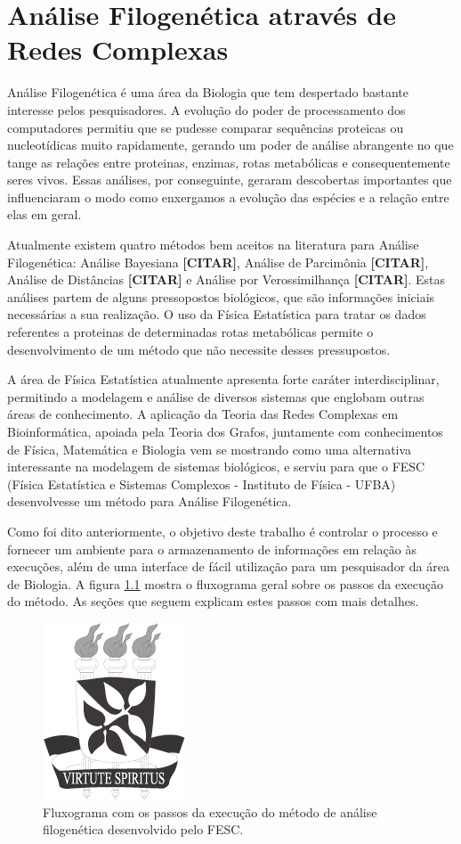 \chapter{Análise Filogenética através de Redes Complexas} \label{cap:analisefilo}

Análise Filogenética é uma área da Biologia que tem despertado bastante interesse pelos pesquisadores. A evolução do poder de processamento dos computadores
permitiu que se pudesse comparar sequências proteicas ou nucleotídicas muito rapidamente, gerando um poder de análise abrangente no que tange as relações entre
proteinas, enzimas, rotas metabólicas e consequentemente seres vivos. Essas análises, por conseguinte, geraram descobertas importantes que influenciaram o
modo como enxergamos a evolução das espécies e a relação entre elas em geral.

Atualmente existem quatro métodos bem aceitos na literatura para Análise Filogenética: Análise Bayesiana \textbf{[CITAR]}, Análise de Parcimônia
\textbf{[CITAR]}, Análise de Distâncias \textbf{[CITAR]} e Análise por Verossimilhança \textbf{[CITAR]}. Estas análises partem de alguns pressopostos
biológicos, que são informações iniciais necessárias a sua realização. O uso da Física Estatística para tratar os dados referentes a proteinas de
determinadas rotas metabólicas permite o desenvolvimento de um método que não necessite desses pressupostos.

A área de Física Estatística atualmente apresenta forte caráter interdisciplinar, permitindo a modelagem e análise de diversos sistemas
que englobam outras áreas de conhecimento. A aplicação da Teoria das Redes Complexas em Bioinformática, apoiada pela Teoria dos Grafos,
juntamente com conhecimentos de Física, Matemática e Biologia vem se mostrando como uma alternativa interessante na modelagem de sistemas biológicos,
e serviu para que o FESC (Física Estatística e Sistemas Complexos - Instituto de Física - UFBA) desenvolvesse um método para Análise Filogenética.

Como foi dito anteriormente, o objetivo deste trabalho é controlar o processo e fornecer um ambiente para o armazenamento de informações em relação às
execuções, além de uma interface de fácil utilização para um pesquisador da área de Biologia. A figura \ref{fig:fluxograma} mostra o fluxograma geral
sobre os passos da execução do método. As seções que seguem explicam estes passos com mais detalhes.

\begin{figure}
\centering
\includegraphics{brasaoUFBA2}
\caption{Fluxograma com os passos da execução do método de análise filogenética desenvolvido pelo FESC.}
\label{fig:fluxograma}
\end{figure}


